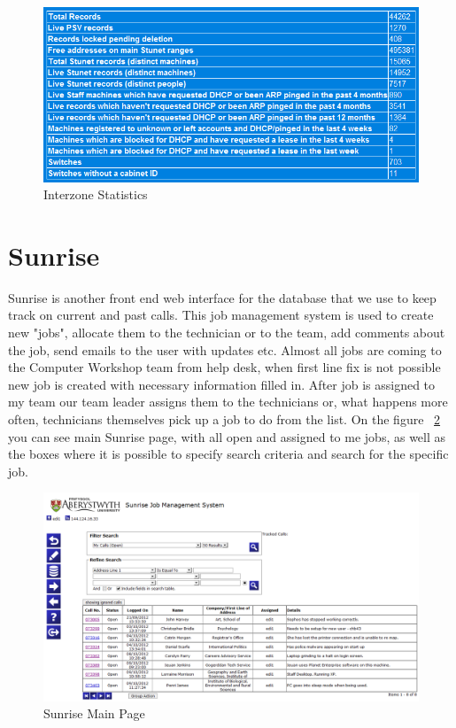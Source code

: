 \documentclass[10pt,a4paper,headinclude=true]{report}
\begin{document}
\begin{figure}[H]
\centering
\centerline{\includegraphics[scale=0.5]{./interzone_statistics}}
\caption{Interzone Statistics}
\label{fig:interzone_statistics}
\end{figure}

\section{Sunrise}
Sunrise is another front end web interface for the database that we use to keep track on current and past calls. This job management system is used to create new "jobs", allocate them to the technician or to the team, add comments about the job, send emails to the user with updates etc. Almost all jobs are coming to the Computer Workshop team from help desk, when first line fix is not possible new job is created with necessary information filled in. After job is assigned to my team our team leader assigns them to the technicians or, what happens more often, technicians themselves pick up a job to do from the list. On the figure ~\ref{fig:sunrise_main} you can see main Sunrise page, with all open and assigned to me jobs, as well as the boxes where it is possible to specify search criteria and search for the specific job.

\begin{figure}[H]
\centering
\centerline{\includegraphics[scale=0.5]{./sunrise_main}}
\caption{Sunrise Main Page}
\label{fig:sunrise_main}
\end{figure}
\end{document}
